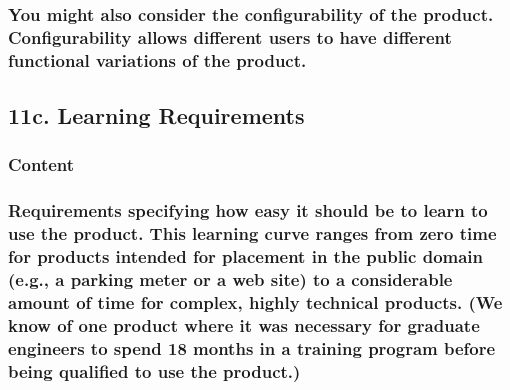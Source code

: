 \documentclass[
]{article}
\begin{document}
\hypertarget{you-might-also-consider-the-configurability-of-the-product.-configurability-allows-different-users-to-have-different-functional-variations-of-the-product.}{%
\subsubsection{\texorpdfstring{You might also consider the
configurability of the product. Configurability allows different users
to have different functional variations of the product.
}{You might also consider the configurability of the product. Configurability allows different users to have different functional variations of the product. }}\label{you-might-also-consider-the-configurability-of-the-product.-configurability-allows-different-users-to-have-different-functional-variations-of-the-product.}}

\hypertarget{c.-learning-requirements}{%
\subsection{\texorpdfstring{11c. Learning Requirements
}{11c. Learning Requirements }}\label{c.-learning-requirements}}

\hypertarget{content-34}{%
\subsubsection{Content}\label{content-34}}

\hypertarget{requirements-specifying-how-easy-it-should-be-to-learn-to-use-the-product.-this-learning-curve-ranges-from-zero-time-for-products-intended-for-placement-in-the-public-domain-e.g.-a-parking-meter-or-a-web-site-to-a-considerable-amount-of-time-for-complex-highly-technical-products.-we-know-of-one-product-where-it-was-necessary-for-graduate-engineers-to-spend-18-months-in-a-training-program-before-being-qualified-to-use-the-product.}{%
\subsubsection{Requirements specifying how easy it should be to learn to
use the product. This learning curve ranges from zero time for products
intended for placement in the public domain (e.g., a parking meter or a
web site) to a considerable amount of time for complex, highly technical
products. (We know of one product where it was necessary for graduate
engineers to spend 18 months in a training program before being
qualified to use the
product.)}\label{requirements-specifying-how-easy-it-should-be-to-learn-to-use-the-product.-this-learning-curve-ranges-from-zero-time-for-products-intended-for-placement-in-the-public-domain-e.g.-a-parking-meter-or-a-web-site-to-a-considerable-amount-of-time-for-complex-highly-technical-products.-we-know-of-one-product-where-it-was-necessary-for-graduate-engineers-to-spend-18-months-in-a-training-program-before-being-qualified-to-use-the-product.}}
\end{document}
